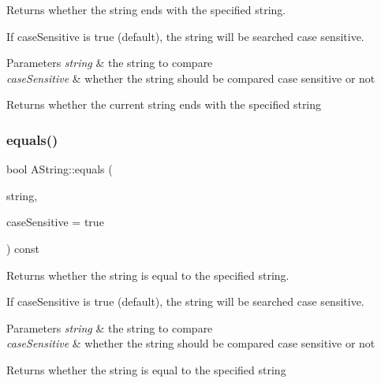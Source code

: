 Returns whether the string ends with the specified string. 

If case\+Sensitive is true (default), the string will be searched case sensitive.


\begin{DoxyParams}{Parameters}
{\em string} & the string to compare \\
\hline
{\em case\+Sensitive} & whether the string should be compared case sensitive or not \\
\hline
\end{DoxyParams}
\begin{DoxyReturn}{Returns}
whether the current string ends with the specified string 
\end{DoxyReturn}
\mbox{\label{class_a_string_a783f45da45fb0e7685932d44a188e831}} 
\subsubsection{\texorpdfstring{equals()}{equals()}}
{\footnotesize\ttfamily bool A\+String\+::equals (\begin{DoxyParamCaption}\item[{const \mbox{\hyperlink{class_a_string}{A\+String}} \&}]{string,  }\item[{bool}]{case\+Sensitive = {\ttfamily true} }\end{DoxyParamCaption}) const}



Returns whether the string is equal to the specified string. 

If case\+Sensitive is true (default), the string will be searched case sensitive.


\begin{DoxyParams}{Parameters}
{\em string} & the string to compare \\
\hline
{\em case\+Sensitive} & whether the string should be compared case sensitive or not \\
\hline
\end{DoxyParams}
\begin{DoxyReturn}{Returns}
whether the string is equal to the specified string 
\end{DoxyReturn}
\mbox{\label{class_a_string_a8430996f2870ab0ffb4a00d7179fbc91}} 

